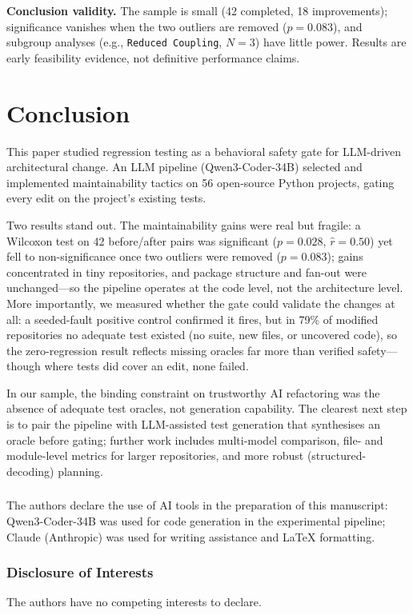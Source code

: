 \documentclass[runningheads]{llncs}
\begin{document}
\textbf{Conclusion validity.} The sample is small (42 completed, 18 improvements); significance vanishes when the two outliers are removed ($p = 0.083$), and subgroup analyses (e.g., \texttt{Reduced Coupling}, $N=3$) have little power. Results are early feasibility evidence, not definitive performance claims.


\section{Conclusion}
\label{sec:conclusion}

This paper studied regression testing as a behavioral safety gate for LLM-driven architectural change. An LLM pipeline (Qwen3-Coder-34B) selected and implemented maintainability tactics on 56 open-source Python projects, gating every edit on the project's existing tests.

Two results stand out. The maintainability gains were real but fragile: a Wilcoxon test on 42 before/after pairs was significant ($p = 0.028$, $\hat{r} = 0.50$) yet fell to non-significance once two outliers were removed ($p = 0.083$); gains concentrated in tiny repositories, and package structure and fan-out were unchanged---so the pipeline operates at the code level, not the architecture level. More importantly, we measured whether the gate could validate the changes at all: a seeded-fault positive control confirmed it fires, but in 79\% of modified repositories no adequate test existed (no suite, new files, or uncovered code), so the zero-regression result reflects missing oracles far more than verified safety---though where tests did cover an edit, none failed.

In our sample, the binding constraint on trustworthy AI refactoring was the absence of adequate test oracles, not generation capability. The clearest next step is to pair the pipeline with LLM-assisted test generation that synthesises an oracle before gating; further work includes multi-model comparison, file- and module-level metrics for larger repositories, and more robust (structured-decoding) planning.

\begin{credits}
\subsubsection{\ackname}
The authors declare the use of AI tools in the preparation of this manuscript: Qwen3-Coder-34B was used for code generation in the experimental pipeline; Claude (Anthropic) was used for writing assistance and \LaTeX{} formatting.

\subsubsection{Disclosure of Interests}
The authors have no competing interests to declare.
\end{credits}
\end{document}
